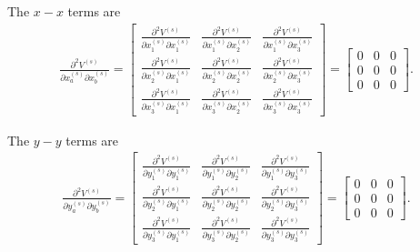\documentclass[12pt,aps,pre]{revtex4}
\begin{document}
The $x-x$ terms are 
%
\begin{eqnarray}
\frac{\partial^2V^{(s)}}{\partial x_a^{(s)} \partial x_b^{(s)}} = 
\begin{bmatrix}
\frac{\partial^2V^{(s)}}{\partial x_1^{(s)} \partial x_1^{(s)}} & \frac{\partial^2V^{(s)}}{\partial x_1^{(s)} \partial x_2^{(s)}}  & \frac{\partial^2V^{(s)}}{\partial x_1^{(s)} \partial x_3^{(s)}} \\
%
\frac{\partial^2V^{(s)}}{\partial x_2^{(s)} \partial x_1^{(s)}} & \frac{\partial^2V^{(s)}}{\partial x_2^{(s)} \partial x_2^{(s)}}  & \frac{\partial^2V^{(s)}}{\partial x_2^{(s)} \partial x_3^{(s)}} \\
%
\frac{\partial^2V^{(s)}}{\partial x_3^{(s)} \partial x_1^{(s)}} & \frac{\partial^2V^{(s)}}{\partial x_3^{(s)} \partial x_2^{(s)}}  & \frac{\partial^2V^{(s)}}{\partial x_3^{(s)} \partial x_3^{(s)}}
\end{bmatrix} =
\begin{bmatrix}
0 & 0 & 0 \\
0 & 0 & 0 \\
0 & 0 & 0
\end{bmatrix}.
\end{eqnarray}
%

The $y-y$ terms are
%
\begin{eqnarray}
\frac{\partial^2V^{(s)}}{\partial y_a^{(s)} \partial y_b^{(s)}} = 
\begin{bmatrix}
\frac{\partial^2V^{(s)}}{\partial y_1^{(s)} \partial y_1^{(s)}} & \frac{\partial^2V^{(s)}}{\partial y_1^{(s)} \partial y_2^{(s)}}  & \frac{\partial^2V^{(s)}}{\partial y_1^{(s)} \partial y_3^{(s)}} \\
%
\frac{\partial^2V^{(s)}}{\partial y_2^{(s)} \partial y_1^{(s)}} & \frac{\partial^2V^{(s)}}{\partial y_2^{(s)} \partial y_2^{(s)}}  & \frac{\partial^2V^{(s)}}{\partial y_2^{(s)} \partial y_3^{(s)}} \\
%
\frac{\partial^2V^{(s)}}{\partial y_3^{(s)} \partial y_1^{(s)}} & \frac{\partial^2V^{(s)}}{\partial y_3^{(s)} \partial y_2^{(s)}}  & \frac{\partial^2V^{(s)}}{\partial y_3^{(s)} \partial y_3^{(s)}}
\end{bmatrix} =
\begin{bmatrix}
0 & 0 & 0 \\
0 & 0 & 0 \\
0 & 0 & 0
\end{bmatrix}.
\end{eqnarray}
%
\end{document}
